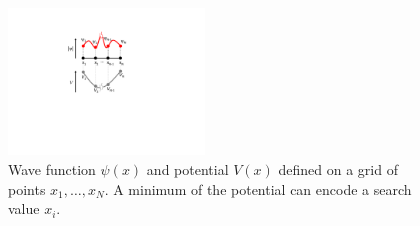 \begin{figure}
\vspace{-1cm}
\includegraphics[width=5.2cm]{"./material/papers/grover/grover_derivation_schroedinger"}
\caption{Wave function $\psi(x)$ and potential $V(x)$ defined on a grid of points $x_1,\hdots,x_N$. A minimum of the potential can encode a search value $x_i$.}
\label{fig:GroverDerivationSchroedinger}
\end{figure}


